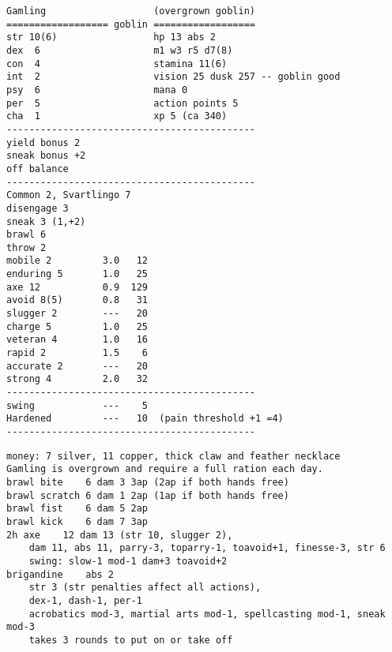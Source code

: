 \goodbreak \small \begin{samepage} \begin{verbatim}
Gamling                   (overgrown goblin)
================== goblin ==================
str 10(6)                 hp 13 abs 2
dex  6                    m1 w3 r5 d7(8)
con  4                    stamina 11(6)
int  2                    vision 25 dusk 257 -- goblin good
psy  6                    mana 0
per  5                    action points 5
cha  1                    xp 5 (ca 340)
--------------------------------------------
yield bonus 2
sneak bonus +2
off balance
--------------------------------------------
Common 2, Svartlingo 7
disengage 3
sneak 3 (1,+2)
brawl 6
throw 2
mobile 2         3.0   12
enduring 5       1.0   25
axe 12           0.9  129
avoid 8(5)       0.8   31
slugger 2        ---   20
charge 5         1.0   25
veteran 4        1.0   16
rapid 2          1.5    6
accurate 2       ---   20
strong 4         2.0   32
--------------------------------------------
swing            ---    5
Hardened         ---   10  (pain threshold +1 =4)
--------------------------------------------
\end{verbatim} \goodbreak \begin{verbatim}
money: 7 silver, 11 copper, thick claw and feather necklace
Gamling is overgrown and require a full ration each day.
brawl bite    6 dam 3 3ap (2ap if both hands free)
brawl scratch 6 dam 1 2ap (1ap if both hands free)
brawl fist    6 dam 5 2ap
brawl kick    6 dam 7 3ap
2h axe    12 dam 13 (str 10, slugger 2),
    dam 11, abs 11, parry-3, toparry-1, toavoid+1, finesse-3, str 6
    swing: slow-1 mod-1 dam+3 toavoid+2
brigandine    abs 2
    str 3 (str penalties affect all actions),
    dex-1, dash-1, per-1
    acrobatics mod-3, martial arts mod-1, spellcasting mod-1, sneak mod-3
    takes 3 rounds to put on or take off
\end{verbatim} \end{samepage} \normalsize

\

